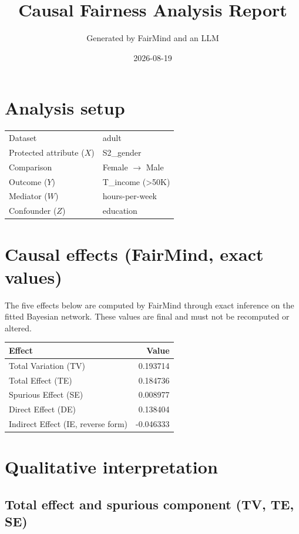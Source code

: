 \documentclass[11pt]{article}
\title{Causal Fairness Analysis Report}
\author{Generated by FairMind and an LLM}
\date{2026-08-19}
\begin{document}
\maketitle

\section{Analysis setup}

\begin{tabular}{ll}
\toprule
Dataset & adult \\
Protected attribute ($X$) & S2\_gender \\
Comparison & Female $\to$ Male \\
Outcome ($Y$) & T\_income (>50K) \\
Mediator ($W$) & hours-per-week \\
Confounder ($Z$) & education \\
\bottomrule
\end{tabular}

\section{Causal effects (FairMind, exact values)}

The five effects below are computed by FairMind through exact inference on the
fitted Bayesian network. These values are final and must not be recomputed or
altered.

\begin{tabular}{lr}
\toprule
Effect & Value \\
\midrule
Total Variation (TV) & 0.193714 \\
Total Effect (TE) & 0.184736 \\
Spurious Effect (SE) & 0.008977 \\
Direct Effect (DE) & 0.138404 \\
Indirect Effect (IE, reverse form) & -0.046333 \\
\bottomrule
\end{tabular}

\section{Qualitative interpretation}

\subsection{Total effect and spurious component (TV, TE, SE)}
\end{document}
